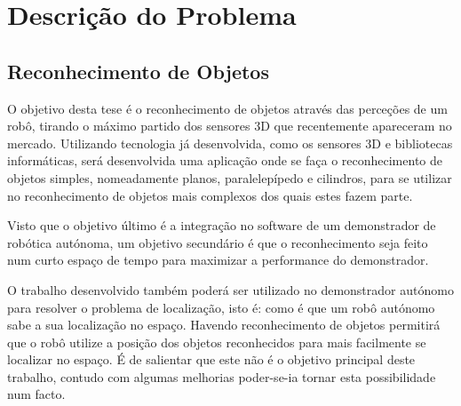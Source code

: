 \chapter{Descrição do Problema}\label{chap:chap3}

\section*{}



\section{Reconhecimento de Objetos}


O objetivo desta tese é o reconhecimento de objetos através das perceções de um robô, tirando o máximo partido dos sensores 3D que recentemente apareceram no mercado. Utilizando tecnologia já desenvolvida, como os sensores 3D e bibliotecas informáticas, será desenvolvida uma aplicação onde se faça o reconhecimento de objetos simples, nomeadamente planos, paralelepípedo e cilindros, para se utilizar no reconhecimento de objetos mais complexos dos quais estes fazem parte.

Visto que o objetivo último é a integração no software de um demonstrador de robótica autónoma, um objetivo secundário é que o reconhecimento seja feito num curto espaço de tempo para maximizar a performance do demonstrador.

O trabalho desenvolvido também poderá ser utilizado no demonstrador autónomo para resolver o problema de localização, isto é: como é que um robô autónomo sabe a sua localização no espaço. Havendo reconhecimento de objetos permitirá que o robô utilize a posição dos objetos reconhecidos para mais facilmente se localizar no espaço. É de salientar que este não é o objetivo principal deste trabalho, contudo com algumas melhorias poder-se-ia tornar esta possibilidade num facto.


